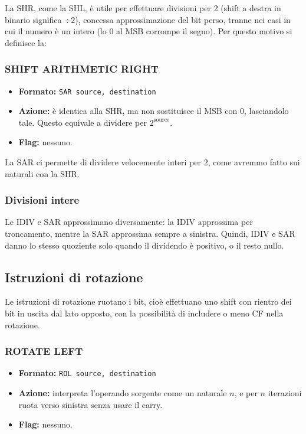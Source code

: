 \documentclass[a4paper,11pt]{article}
\begin{document}
La SHR, come la SHL, è utile per effettuare divisioni per 2 (shift a destra in binario significa $\div 2$), concessa approssimazione del bit perso, tranne nei casi in cui il numero è un intero (lo 0 al MSB corrompe il segno). 
Per questo motivo si definisce la:

\subsubsection{SHIFT ARITHMETIC RIGHT}
\begin{itemize}
	\item \textbf{Formato:} \texttt{SAR source, destination}
	\item \textbf{Azione:} è identica alla SHR, ma non sostituisce il MSB con 0, lasciandolo tale.
		Questo equivale a dividere per $2^\text{source}$.
	\item \textbf{Flag:} nessuno.
\end{itemize}

La SAR ci permette di dividere velocemente interi per 2, come avremmo fatto sui naturali con la SHR.

\subsubsection{Divisioni intere}
Le IDIV e SAR approssimano diversamente: la IDIV approssima per troncamento, mentre la SAR approssima sempre a sinistra.
Quindi, IDIV e SAR danno lo stesso quoziente solo quando il dividendo è positivo, o il resto nullo.

\subsection{Istruzioni di rotazione}
Le istruzioni di rotazione ruotano i bit, cioè effettuano uno shift con rientro dei bit in uscita dal lato opposto, con la possibilità di includere o meno CF nella rotazione.

\subsubsection{ROTATE LEFT}
\begin{itemize}
	\item \textbf{Formato:} \texttt{ROL source, destination}
	\item \textbf{Azione:} interpreta l'operando sorgente come un naturale $n$, e per $n$ iterazioni ruota verso sinistra senza usare il carry.
	\item \textbf{Flag:} nessuno.
\end{itemize}
\end{document}

